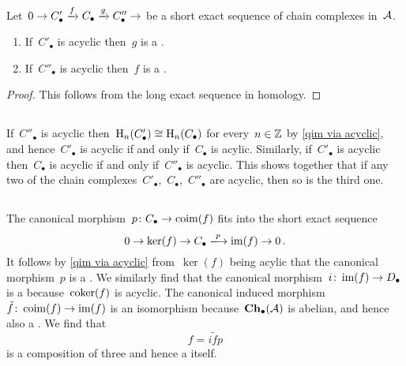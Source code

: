 \section{}



\begin{lemma}
  \label{qim via acyclic}
  Let~$0 \to C'_\bullet \xrightarrow{f} C_\bullet \xrightarrow{g} C''_\bullet \to $ be a short exact sequence of chain complexes in~$\mathcal{A}$.
  \begin{enumerate}
    \item
      If~$C'_\bullet$ is acyclic then~$g$ is a {\qim}.
    \item
      If~$C''_\bullet$ is acyclic then~$f$ is a {\qim}.
  \end{enumerate}
\end{lemma}


\begin{proof}
  This follows from the long exact sequence in homology.
\end{proof}





\subsection{}

If~$C''_\bullet$ is acyclic then~$\operatorname{H}_n(C'_\bullet) \cong \operatorname{H}_n(C_\bullet)$ for every~$n \in \mathbb{Z}$ by \cref{qim via acyclic}, and hence~$C'_\bullet$ is acyclic if and only if~$C_\bullet$ is acylic.
Similarly, if~$C'_\bullet$ is acyclic then~$C_\bullet$ is acyclic if and only if~$C''_\bullet$ is acyclic.
This shows together that if any two of the chain complexes~$C'_\bullet$,~$C_\bullet$,~$C''_\bullet$ are acyclic, then so is the third one.





\subsection{}

The canonical morphism~$p \colon C_\bullet \to \operatorname{coim}(f)$ fits into the short exact sequence
\[
  0
  \to
  \ker(f)
  \to
  C_\bullet
  \xlongto{p}
  \im(f)
  \to
  0 \,.
\]
It follows by \cref{qim via acyclic} from~$\ker(f)$ being acylic that the canonical morphism~$p$ is a {\qim}.
We similarly find that the canonical morphism~$i \colon \operatorname{im}(f) \to D_\bullet$ is a {\qim} because~$\operatorname{coker}(f)$ is acyclic.
The canonical induced morphism~$\tilde{f} \colon \operatorname{coim}(f) \to \operatorname{im}(f)$ is an isomorphism because~$\mathbf{Ch}_\bullet(\mathcal{A})$ is abelian, and hence also a {\qim}.
We find that
\[
    f
  = i \tilde{f} p
\]
is a composition of three {\qim} and hence a {\qim} itself.





